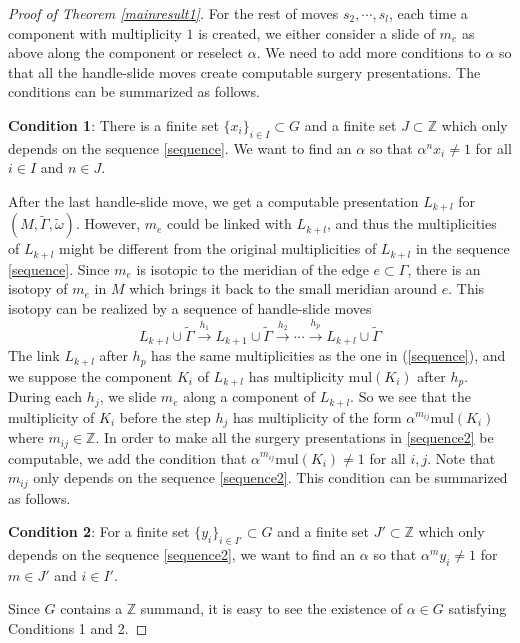 \documentclass[12pt]{amsart}
\begin{document}
\begin{proof}[Proof of Theorem \ref{mainresult1}]
For the rest of moves $s_2, \cdots, s_l$, each time a component with multiplicity $1$ is created, we either consider a slide of $m_e$ as above along the component or reselect $\alpha$. We need to add more conditions to $\alpha$ so that all the handle-slide moves create computable surgery presentations. The conditions can be summarized as follows. 

{\bf Condition 1}: There is a finite set $\{x_i\}_{i\in I}\subset G$ and a finite set $J\subset {\mathbb{Z}}$ which only depends on the sequence \eqref{sequence}. We want to find an $\alpha$ so that $\alpha^{n} x_i\neq 1$ for all $i\in I$ and $n\in J$.
 
After the last handle-slide move, we get a computable presentation $L_{k+l}$ for $(M, \tilde{\Gamma}, \tilde{\omega})$. However, $m_e$ could be linked with $L_{k+l}$, and thus the multiplicities of $L_{k+l}$ might be different from the original multiplicities of $L_{k+l}$ in the sequence \eqref{sequence}. Since $m_e$ is isotopic to the meridian of the edge $e\subset \Gamma$, there is an isotopy of $m_e$ in $M$ which brings it back to the small meridian around $e$. This isotopy can be realized by a sequence of handle-slide moves
\begin{equation*}
\label{sequence2}
L_{k+l}\cup \tilde{\Gamma} \xrightarrow{h_1} L_{k+1}\cup \tilde{\Gamma}\xrightarrow{h_2} \cdots \xrightarrow{h_p} L_{k+l}\cup \tilde{\Gamma} \tag{H2}
\end{equation*}
The link $L_{k+l}$ after $h_p$ has the same multiplicities as the one in (\ref{sequence}), and we suppose the component $K_i$ of $L_{k+l}$ has multiplicity $\mathrm{mul}(K_i)$ after $h_p$. During each $h_j$, we slide $m_e$ along a component of $L_{k+l}$. So we see that the multiplicity of $K_i$ before the step $h_j$ has multiplicity of the form $\alpha^{m_{ij}}\mathrm{mul}(K_i)$ where $m_{ij}\in \mathbb{Z}$. In order to make all the surgery presentations in \eqref{sequence2} be computable, we add the condition that $\alpha^{m_{ij}}\mathrm{mul}(K_i)\neq 1$ for all $i, j$. Note that $m_{ij}$ only depends on the sequence \eqref{sequence2}. This condition can be summarized as follows.

{\bf Condition 2}: For a finite set $\{y_i\}_{i\in I'}\subset G$ and a finite set $J'\subset {\mathbb{Z}}$ which only depends on the sequence \eqref{sequence2}, we want to find an $\alpha$ so that $\alpha^{m}y_i\neq 1$ for $m\in J'$ and $i\in I'$. 

Since $G$ contains a $\mathbb{Z}$ summand, it is easy to see the existence of $\alpha\in G$ satisfying Conditions 1 and 2.


\end{proof}
\end{document}

